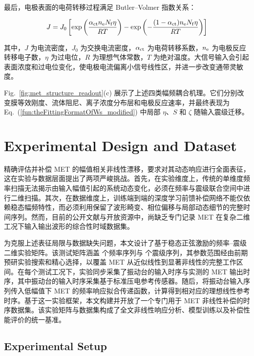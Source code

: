 \documentclass[sn-nature]{sn-jnl}
\newif\ifCNENEnglish
\newif\ifCNENBilingual
\newcommand{\CNEN}[2]{%
    \ifCNENBilingual
        #1%
        \if\relax\detokenize{#2}\relax\else\par #2\fi%
    \else
        \ifCNENEnglish
            #2%
        \else
            #1%
        \fi
    \fi
}
\newcommand{\fn}{\eta} %
\newcommand{\Sen}{S} %
\begin{document}
\CNEN{最后，电极表面的电荷转移过程满足 Butler--Volmer 指数关系：}{}
\begin{equation}
    J = J_0 \left[
    \exp\left(\frac{\alpha_{\rm ct} n_{\rm e} N_{\rm f} \eta}{RT}\right)
    -
    \exp\left(-\frac{(1-\alpha_{\rm ct}) n_{\rm e} N_{\rm f} \eta}{RT}\right)
    \right]
    \label{eq:butler_volmer_nonlinear}
\end{equation}
\CNEN{其中，$J$ 为电流密度，$J_0$ 为交换电流密度，$\alpha_{\rm ct}$ 为电荷转移系数，$n_{\rm e}$ 为电极反应转移电子数，$\eta$ 为过电位，$R$ 为理想气体常数，$T$ 为绝对温度。大信号输入会引起表面浓度和过电位变化，使电极电流偏离小信号线性区，并进一步改变通带灵敏度。}{}

\CNEN{Fig.~\ref{fig:met_structure_readout}(c) 展示了上述四类幅频耦合机理。它们分别改变膜等效刚度、流体阻尼、离子浓度分布层和电极反应速率，并最终表现为 Eq.~(\ref{fun:theFittingFormatOfWs_modified}) 中局部 $\fn$、$\Sen$ 和 $\zeta$ 随输入震级迁移。}{}

\section{Experimental Design and Dataset}

\CNEN{精确评估并补偿 MET 的幅值相关非线性漂移，要求对其动态响应进行全面表征，这在实验与数据层面提出了两项严峻挑战。首先，在实验维度上，传统的单维度频率扫描\cite{WOS:000492361300009}无法揭示由输入幅值引起的系统动态变化，必须在频率与震级联合空间中进行二维扫描。其次，在数据维度上，训练端到端的深度学习前馈补偿网络不能仅依赖稳态幅频特性，而必须利用保留了波形畸变、相位偏移与局部动态细节的完整时间序列。然而，目前的公开文献与开放资源中，尚缺乏专门记录 MET 在复杂二维工况下输入输出波形的综合性时域数据集。}{}

\CNEN{为克服上述表征局限与数据缺失问题，本文设计了基于稳态正弦激励的频率--震级二维实验矩阵。该测试矩阵涵盖 \valFreqScanPoints{} 个频率序列与 \valMagScanPoints{} 个震级序列，其参数范围经由前期预研实验搜索和精心选择，以覆盖 MET 从近似线性到显著非线性的完整工作区间。在每个测试工况下，实验同步采集了振动台的输入时序与实测的 MET 输出时序，其中振动台的输入时序采集基于标准压电参考传感器。随后，将振动台输入序列传入低幅值下 MET 的频率响应拟合传递函数，计算得到相对应的理想线性参考时序。基于这一实验框架，本文构建并开放了一个专门用于 MET 非线性补偿的时序数据集。该实验矩阵与数据集构成了全文非线性响应分析、模型训练以及补偿性能评价的统一基准。}{}

\subsection{Experimental Setup}
\end{document}
